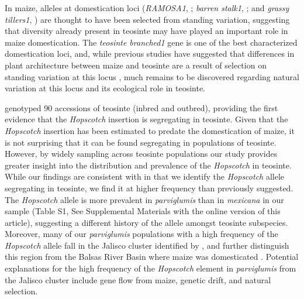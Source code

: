 \documentclass[11pt]{article} %
\begin{document}
\begin{linenumbers}
\begin{flushleft}
In maize, alleles at domestication loci (\emph{RAMOSA1}, \citealt{SigmonVollbrecht2010}; \emph{barren stalk1}, \citealt{Gallavotti2004}; and \emph{grassy tillers1}, \citealt{Whipple2011}) are thought to have been selected from standing variation, suggesting that diversity already present in teosinte may have played an important role in maize domestication. The \emph{teosinte branched1} gene is one of the best characterized domestication loci, and, while previous studies have suggested that differences in plant architecture between maize and teosinte are a result of selection on standing variation at this locus \citep{Clark2006, Studer2011}, much remains to be discovered regarding natural variation at this locus and its ecological role in teosinte.

\citet{Studer2011} genotyped 90 accessions of teosinte (inbred and outbred), providing the first evidence that the \emph{Hopscotch} insertion is segregating in teosinte. 
Given that the \emph{Hopscotch} insertion has been estimated to predate the domestication of maize, it is not surprising that it can be found segregating in populations of teosinte. However, by widely sampling across teosinte populations our study provides greater insight into the distribution and prevalence of the \emph{Hopscotch} in teosinte. While our findings are consistent with \citet{Studer2011} in that we identify the \emph{Hopscotch} allele segregating in teosinte, we find it at higher frequency than previously suggested.
The \emph{Hopscotch} allele is more prevalent in \emph{parviglumis} than in \emph{mexicana} in our sample (Table S1, See Supplemental Materials with the online version of this article), suggesting a different history of the allele amongst teosinte subspecies.
Moreover, many of our \emph{parviglumis} populations with a high frequency of the \emph{Hopscotch} allele fall in the Jalisco cluster identified by \citet{Fukunaga2005}, and further distinguish this region from the Balsas River Basin where maize was domesticated \citep{Matsuoka2002}. Potential explanations for the high frequency of the \emph{Hopscotch} element in \emph{parviglumis} from the Jalisco cluster include gene flow from maize, genetic drift, and natural selection. 


\end{flushleft}
\end{linenumbers}
\end{document}
